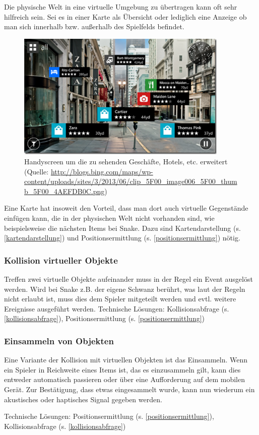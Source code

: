 Die physische Welt in eine virtuelle Umgebung zu übertragen kann oft sehr hilfreich sein.
Sei es in einer Karte als Übersicht oder lediglich eine Anzeige ob man sich innerhalb bzw.
außerhalb des Spielfelds befindet. 
\begin{figure}[htbp]
  \centering
    \includegraphics[width=0.9\textwidth]{3-Spielkonzepte/3-1-Erweiterte_Realitaet/map01.png}
     \caption{Handyscreen um die zu sehenden Geschäfte, Hotels, etc. erweitert
	(Quelle: \url{http://blogs.bing.com/maps/wp-content/uploads/sites/3/2013/06/clip_5F00_image006_5F00_thumb_5F00_4AEFDB0C.png})
		}
\end{figure}
Eine Karte hat insoweit den Vorteil, dass man dort auch
virtuelle Gegenstände einfügen kann, die in der physischen Welt nicht vorhanden
sind, wie beispielsweise die nächsten Items bei Snake.
Dazu sind 
Kartendarstellung (s. \ref{kartendarstellung}) und Positionsermittlung (s. \ref{positionsermittlung}) nötig.

\subsubsection{Kollision virtueller Objekte}
Treffen zwei virtuelle Objekte aufeinander muss in der Regel ein Event ausgelöst werden.
Wird bei Snake z.B. der eigene Schwanz berührt, was laut der Regeln nicht erlaubt ist, muss
dies dem Spieler mitgeteilt werden und evtl. weitere Ereignisse ausgeführt werden.
\newline
Technische Lösungen:
Kollisionsabfrage (s. \ref{kollisionsabfrage}), Positionsermittlung (s. \ref{positionsermittlung})


\subsubsection{Einsammeln von Objekten}
Eine Variante der Kollision mit virtuellen Objekten ist das Einsammeln. Wenn ein Spieler in
Reichweite eines Items ist, das es einzusammeln gilt, kann dies entweder automatisch
passieren oder über eine Aufforderung auf dem mobilen Gerät. Zur Bestätigung, dass
etwas eingesammelt wurde, kann nun wiederum ein akustisches oder haptisches Signal
gegeben werden.


Technische Lösungen:
Positionsermittlung (s. \ref{positionsermittlung}), Kollisionsabfrage (s. \ref{kollisionsabfrage})
